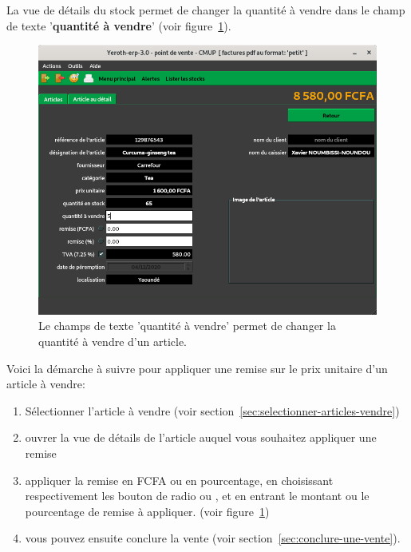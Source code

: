 \begin{itemize}
	La vue de d\'etails du stock permet de changer
	la quantit\'e \`a vendre dans le champ de texte
	'\textbf{quantit\'e \`a vendre}'
	(voir figure~\ref{fig:yeren-vente-afficher-details-stock}).
	\begin{figure}[!htbp]
		\centering
		\includegraphics[scale=0.63]{images/yeren-vente-afficher-details-stock.png}
		\caption{Le champs de texte 'quantit\'e \`a vendre'
			permet de changer la quantit\'e \`a vendre d'un article.}
			\label{fig:yeren-vente-afficher-details-stock}
	\end{figure}
\end{itemize}


\newpage
{}\label{sec:appliquer-remise-sur-article}

Voici la d\'emarche \`a suivre pour appliquer une remise
sur le prix unitaire d'un article \`a vendre:

\begin{enumerate}[1)]
	\item S\'electionner l'article \`a vendre (voir section~\ref{sec:selectionner-articles-vendre})
	\item ouvrer la vue de d\'etails de l'article auquel
		vous souhaitez appliquer une remise
		
	\item appliquer la remise en FCFA ou en pourcentage,
		en choisissant respectivement les bouton de radio
		 ou , et
		en entrant le montant ou le pourcentage de remise
		\`a appliquer. (voir figure~\ref{fig:yeren-vente-afficher-details-stock})
		
	\item vous pouvez ensuite conclure la vente (voir section~\ref{sec:conclure-une-vente}).
\end{enumerate} 


